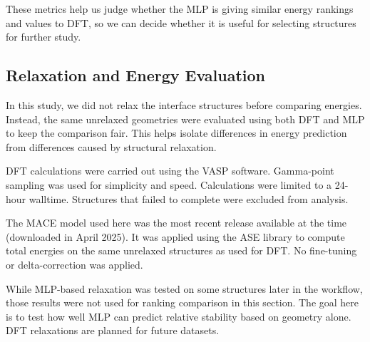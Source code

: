 These metrics help us judge whether the MLP is giving similar energy rankings and values to DFT, so we can decide whether it is useful for selecting structures for further study.

\subsection{Relaxation and Energy Evaluation}

In this study, we did not relax the interface structures before comparing energies. Instead, the same unrelaxed geometries were evaluated using both DFT and MLP to keep the comparison fair. This helps isolate differences in energy prediction from differences caused by structural relaxation.

DFT calculations were carried out using the VASP software. Gamma-point sampling was used for simplicity and speed. Calculations were limited to a 24-hour walltime. Structures that failed to complete were excluded from analysis.

The MACE model used here was the most recent release available at the time (downloaded in April 2025). It was applied using the ASE library to compute total energies on the same unrelaxed structures as used for DFT. No fine-tuning or delta-correction was applied.

While MLP-based relaxation was tested on some structures later in the workflow, those results were not used for ranking comparison in this section. The goal here is to test how well MLP can predict relative stability based on geometry alone. DFT relaxations are planned for future datasets.